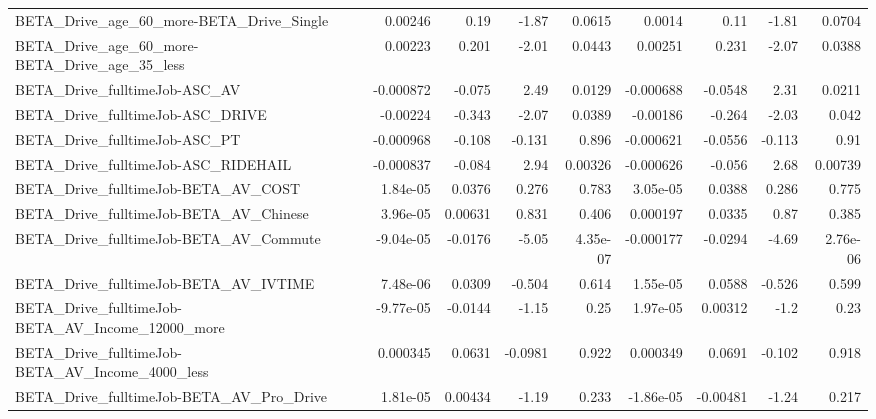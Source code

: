 \begin{tabular}{lrrrrrrrr}
BETA\_Drive\_age\_60\_more-BETA\_Drive\_Single           &     0.00246 &         0.19 &     -1.87 &   0.0615 &     0.0014 &        0.11 &        -1.81 &        0.0704 \\
BETA\_Drive\_age\_60\_more-BETA\_Drive\_age\_35\_less      &     0.00223 &        0.201 &     -2.01 &   0.0443 &    0.00251 &       0.231 &        -2.07 &        0.0388 \\
BETA\_Drive\_fulltimeJob-ASC\_AV                      &   -0.000872 &       -0.075 &      2.49 &   0.0129 &  -0.000688 &     -0.0548 &         2.31 &        0.0211 \\
BETA\_Drive\_fulltimeJob-ASC\_DRIVE                   &    -0.00224 &       -0.343 &     -2.07 &   0.0389 &   -0.00186 &      -0.264 &        -2.03 &         0.042 \\
BETA\_Drive\_fulltimeJob-ASC\_PT                      &   -0.000968 &       -0.108 &    -0.131 &    0.896 &  -0.000621 &     -0.0556 &       -0.113 &          0.91 \\
BETA\_Drive\_fulltimeJob-ASC\_RIDEHAIL                &   -0.000837 &       -0.084 &      2.94 &  0.00326 &  -0.000626 &      -0.056 &         2.68 &       0.00739 \\
BETA\_Drive\_fulltimeJob-BETA\_AV\_COST                &    1.84e-05 &       0.0376 &     0.276 &    0.783 &   3.05e-05 &      0.0388 &        0.286 &         0.775 \\
BETA\_Drive\_fulltimeJob-BETA\_AV\_Chinese             &    3.96e-05 &      0.00631 &     0.831 &    0.406 &   0.000197 &      0.0335 &         0.87 &         0.385 \\
BETA\_Drive\_fulltimeJob-BETA\_AV\_Commute             &   -9.04e-05 &      -0.0176 &     -5.05 & 4.35e-07 &  -0.000177 &     -0.0294 &        -4.69 &      2.76e-06 \\
BETA\_Drive\_fulltimeJob-BETA\_AV\_IVTIME              &    7.48e-06 &       0.0309 &    -0.504 &    0.614 &   1.55e-05 &      0.0588 &       -0.526 &         0.599 \\
BETA\_Drive\_fulltimeJob-BETA\_AV\_Income\_12000\_more   &   -9.77e-05 &      -0.0144 &     -1.15 &     0.25 &   1.97e-05 &     0.00312 &         -1.2 &          0.23 \\
BETA\_Drive\_fulltimeJob-BETA\_AV\_Income\_4000\_less    &    0.000345 &       0.0631 &   -0.0981 &    0.922 &   0.000349 &      0.0691 &       -0.102 &         0.918 \\
BETA\_Drive\_fulltimeJob-BETA\_AV\_Pro\_Drive           &    1.81e-05 &      0.00434 &     -1.19 &    0.233 &  -1.86e-05 &    -0.00481 &        -1.24 &         0.217 \\

\end{tabular}
